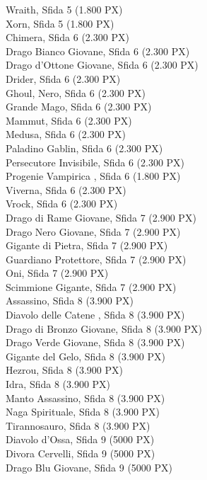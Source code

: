 \begin{multicols}{3}
{		Wraith, Sfida 5 (1.800 PX)\\
		Xorn, Sfida 5 (1.800 PX)\\
		Chimera, Sfida 6 (2.300 PX)\\
		Drago Bianco Giovane, Sfida 6 (2.300 PX)\\
		Drago d'Ottone Giovane, Sfida 6 (2.300 PX)\\
		Drider, Sfida 6 (2.300 PX)\\
		Ghoul, Nero, Sfida 6 (2.300 PX)\\
		Grande Mago, Sfida 6 (2.300 PX)\\
		Mammut, Sfida 6 (2.300 PX)\\
		Medusa, Sfida 6 (2.300 PX)\\
		Paladino Gablin, Sfida 6 (2.300 PX)\\
		Persecutore Invisibile, Sfida 6 (2.300 PX)\\
		Progenie Vampirica  , Sfida 6 (1.800 PX)\\
		Viverna, Sfida 6 (2.300 PX)\\
		Vrock, Sfida 6 (2.300 PX)\\
		Drago di Rame Giovane, Sfida 7 (2.900 PX)\\
		Drago Nero Giovane, Sfida 7 (2.900 PX)\\
		Gigante di Pietra, Sfida 7 (2.900 PX)\\
		Guardiano Protettore, Sfida 7 (2.900 PX)\\
		Oni, Sfida 7 (2.900 PX)\\
		Scimmione Gigante, Sfida 7 (2.900 PX)\\
		Assassino, Sfida 8 (3.900 PX)\\
		Diavolo delle Catene , Sfida 8 (3.900 PX)\\
		Drago di Bronzo Giovane, Sfida 8 (3.900 PX)\\
		Drago Verde Giovane, Sfida 8 (3.900 PX)\\
		Gigante del Gelo, Sfida 8 (3.900 PX)\\
		Hezrou, Sfida 8 (3.900 PX)\\
		Idra, Sfida 8 (3.900 PX)\\
		Manto Assassino, Sfida 8 (3.900 PX)\\
		Naga Spirituale, Sfida 8 (3.900 PX)\\
		Tirannosauro, Sfida 8 (3.900 PX)\\
		Diavolo d'Ossa, Sfida 9 (5000 PX)\\
		Divora Cervelli, Sfida 9 (5000 PX)\\
		Drago Blu Giovane, Sfida 9 (5000 PX)\\
}
\end{multicols}
